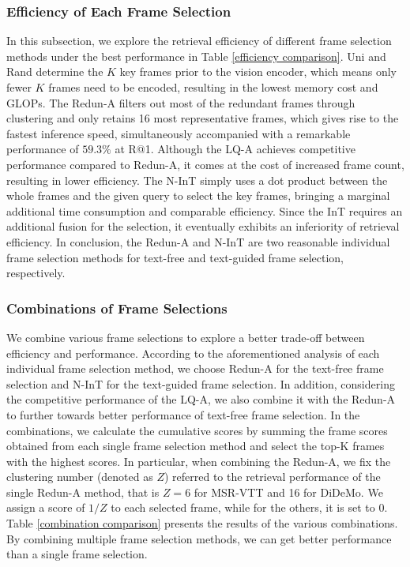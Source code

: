 \documentclass[11pt]{article}
\begin{document}
\subsubsection{Efficiency of Each Frame Selection}
In this subsection, we explore the retrieval efficiency of different frame selection methods under the best performance in Table \ref{efficiency comparison}.
Uni and Rand determine the $K$ key frames prior to the vision encoder, which means only fewer $K$ frames need to be encoded, resulting in the lowest memory cost and GLOPs.
The Redun-A filters out most of the redundant frames through clustering and only retains 16 most representative frames, which gives rise to the fastest inference speed, simultaneously accompanied with a remarkable performance of $59.3\%$ at R@1.
Although the LQ-A achieves competitive performance compared to Redun-A, it comes at the cost of increased frame count, resulting in lower efficiency.
The N-InT simply uses a dot product between the whole frames and the given query to select the key frames, bringing a marginal additional time consumption and comparable efficiency.
Since the InT requires an additional fusion for the selection, it eventually exhibits an inferiority of retrieval efficiency.
In conclusion, the Redun-A and N-InT are two reasonable individual frame selection methods for text-free and text-guided frame selection, respectively.

\subsubsection{Combinations of Frame Selections}

We combine various frame selections to explore a better trade-off between efficiency and performance.
According to the aforementioned analysis of each individual frame selection method, we choose Redun-A for the text-free frame selection and N-InT for the text-guided frame selection.
In addition, considering the competitive performance of the LQ-A, we also combine it with the Redun-A to further towards better performance of text-free frame selection.
In the combinations, we calculate the cumulative scores by summing the frame scores obtained from each single frame selection method and select the top-K frames with the highest scores. 
In particular, when combining the Redun-A, we fix the clustering number (denoted as $Z$) referred to the retrieval performance of the single Redun-A method, that is $Z=6$ for MSR-VTT and 16 for DiDeMo. 
We assign a score of $1/Z$ to each selected frame, while for the others, it is set to $0$.
Table \ref{combination comparison} presents the results of the various combinations.
By combining multiple frame selection methods, we can get better performance than a single frame selection.
\end{document}
